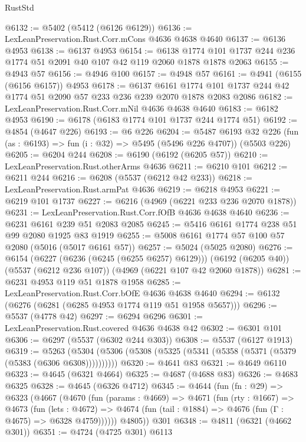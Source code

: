 \begin{lexlean}{RustStd}
\begin{coremodule}
@6132 := @5402 (@5412 (@6126 @6129))
@6136 := LexLeanPreservation.Rust.Corr.mCons @4636 @4638 @4640
@6137 := @6136 @4953
@6138 := @6137 @4953
@6154 := @6138 @1774 @101 @1737 @244 @236 @1774 @51 @2091 @40 @107 @42 @119 @2060 @1878 @1878 @2063
@6155 := @4943 @57
@6156 := @4946 @100
@6157 := @4948 @57
@6161 := @4941 (@6155 (@6156 @6157)) @4953
@6178 := @6137
    @6161
    @1774
    @101
    @1737
    @244
    @42
    @1774
    @51
    @2090
    @57
    @233
    @236
    @239
    @2070
    @1878
    @2083
    @2086
@6182 := LexLeanPreservation.Rust.Corr.mNil @4636 @4638 @4640
@6183 := @6182 @4953
@6190 := @6178 (@6183 @1774 @101 @1737 @244 @1774 @51)
@6192 := @4854 (@4647 @226)
@6193 := @6 @226
@6204 := @5487
    @6193
    @32
    @226
    (fun (as : @6193) => fun (i : @32) => @5495 (@5496 @226 @4707))
    (@5503 @226)
@6205 := @6204 @244
@6208 := @6190 (@6192 (@6205 @57))
@6210 := LexLeanPreservation.Rust.otherArms @4636
@6211 := @6210 @101
@6212 := @6211 @244
@6216 := @6208 (@5537 (@6212 @42 @233))
@6218 := LexLeanPreservation.Rust.armPat @4636
@6219 := @6218 @4953
@6221 := @6219 @101 @1737
@6227 := @6216 (@4969 (@6221 @233 @236 @2070 @1878))
@6231 := LexLeanPreservation.Rust.Corr.fOfB @4636 @4638 @4640
@6236 := @6231 @6161 @239 @51 @2083 @2085
@6245 := @5416 @6161 @1774 @238 @51 @99 @2080 @1925 @83 @1919
@6255 := @5008 @6161 @1774 @57 @100 @57 @2080 (@5016 (@5017 @6161 @57))
@6257 := @5024 (@5025 @2080)
@6276 := @6154
    (@6227 (@6236 (@6245 (@6255 @6257) @6129)))
    (@6192 (@6205 @40))
    (@5537 (@6212 @236 @107))
    (@4969 (@6221 @107 @42 @2060 @1878))
@6281 := @6231 @4953 @119 @51 @1878 @1958
@6285 := LexLeanPreservation.Rust.Corr.bOfE @4636 @4638 @4640
@6294 := @6132 (@6276 (@6281 (@6285 @4953 @1774 @119 @51 @1958 @5657)))
@6296 := @5537 (@4778 @42)
@6297 := @6294 @6296
@6301 := LexLeanPreservation.Rust.covered @4636 @4638 @42
@6302 := @6301 @101
@6306 := @6297 (@5537 (@6302 @244 @303))
@6308 := @5537 (@6127 @1913)
@6319 := @5263 (@5304 (@5306 (@5308 (@5325 (@5341 (@5358 (@5371 (@5379 (@5383 (@6306 @6308))))))))))
@6320 := @4641 @83
@6321 := @4649 @6110
@6323 := @4645 (@6321 @4664)
@6325 := @4687 (@4688 @83)
@6326 := @4683 @6325
@6328 := @4645 (@6326 @4712)
@6345 := @4644
    (fun (fn : @29) =>
    @6323
      (@4667
        (@4670
          (fun (params : @4669) =>
          @4671
            (fun (rty : @1667) =>
            @4673
              (fun (lets : @4672) =>
              @4674 (fun (tail : @1884) => @4676 (fun (Γ : @4675) => @6328 @4759))))))
        @4805))
    @301
@6348 := @4811 (@6321 (@4662 @301))
@6351 := @4724 (@4725 @301) @6113

\end{coremodule}
\end{lexlean}
